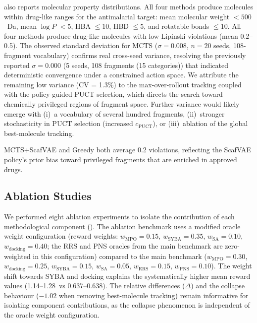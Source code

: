 \documentclass[jcim,article,layout=manuscript]{achemso}
\begin{document}
 also reports molecular property distributions.
All four methods produce molecules within drug-like ranges for the
antimalarial target: mean molecular weight $< 500$~Da, mean $\log P$
$< 5$, HBA $\leq 10$, HBD $\leq 5$, and rotatable bonds $\leq 10$.
All four methods produce drug-like molecules with low Lipinski violations
(mean 0.2--0.5). The observed standard deviation for MCTS ($\sigma = 0.008$, $n=20$ seeds, 108-fragment
vocabulary) confirms real cross-seed variance, resolving the previously
reported $\sigma = 0.000$ (5 seeds, 108 fragments (15 categories)) that indicated
deterministic convergence under a constrained action space. We attribute
the remaining low variance (CV = 1.3\%) to the max-over-rollout tracking
coupled with the policy-guided PUCT selection, which directs the search
toward chemically privileged regions of fragment space. Further variance
would likely emerge with (i)~a vocabulary of several hundred fragments,
(ii)~stronger stochasticity in PUCT selection (increased $c_{\text{PUCT}}$),
or (iii)~ablation of the global best-molecule tracking.

MCTS+ScafVAE and Greedy both average 0.2 violations,
reflecting the ScafVAE policy's prior bias toward privileged fragments
that are enriched in approved drugs.

\subsection{Ablation Studies}

We performed eight ablation experiments to isolate the contribution of
each methodological component (). The ablation
benchmark uses a modified oracle weight configuration (reward weights:
$w_{\text{MPO}}=0.15$, $w_{\text{SYBA}}=0.35$, $w_{\text{SA}}=0.10$,
$w_{\text{docking}}=0.40$; the RRS and PNS oracles from the main
benchmark are zero-weighted in this configuration) compared to the main
benchmark ($w_{\text{MPO}}=0.30$, $w_{\text{docking}}=0.25$,
$w_{\text{SYBA}}=0.15$, $w_{\text{SA}}=0.05$, $w_{\text{RRS}}=0.15$,
$w_{\text{PNS}}=0.10$). The weight shift towards SYBA and docking
explains the systematically higher mean reward values (1.14--1.28~vs
0.637--0.638). The relative differences ($\Delta$) and the collapse
behaviour ($-1.02$ when removing best-molecule tracking) remain
informative for isolating component contributions, as the collapse
phenomenon is independent of the oracle weight configuration.
\end{document}
